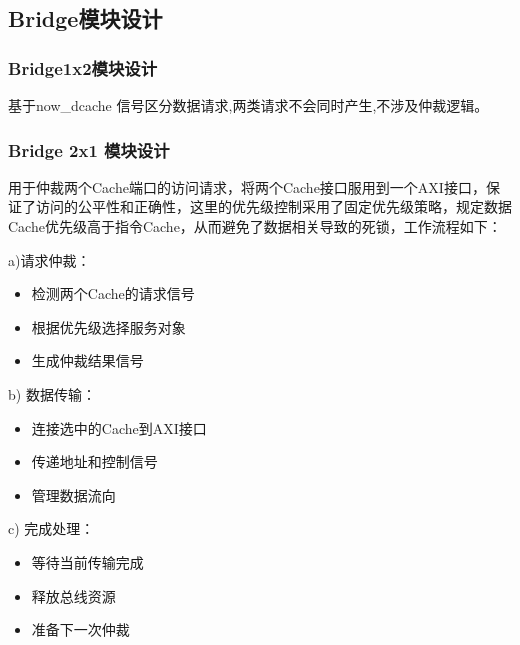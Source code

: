 \begin{flushleft}
\subsection{Bridge模块设计}
\subsubsection{Bridge1x2模块设计}
基于now\_dcache 信号区分数据请求,两类请求不会同时产生,不涉及仲裁逻辑。
\end{flushleft}

\begin{flushleft}
\subsubsection{Bridge 2x1 模块设计}
用于仲裁两个Cache端口的访问请求，将两个Cache接口服用到一个AXI接口，保证了访问的公平性和正确性，这里的优先级控制采用了固定优先级策略，规定数据Cache优先级高于指令Cache，从而避免了数据相关导致的死锁，工作流程如下：
\end{flushleft}
\begin{flushleft}
a)请求仲裁：
\begin{itemize}
\item 检测两个Cache的请求信号
\item 根据优先级选择服务对象
\item 生成仲裁结果信号
\end{itemize}

b) 数据传输：
\begin{itemize}
\item 连接选中的Cache到AXI接口
\item 传递地址和控制信号
\item 管理数据流向
\end{itemize}

c) 完成处理：
\begin{itemize}
\item 等待当前传输完成
\item 释放总线资源
\item 准备下一次仲裁
\end{itemize}
\end{flushleft}

